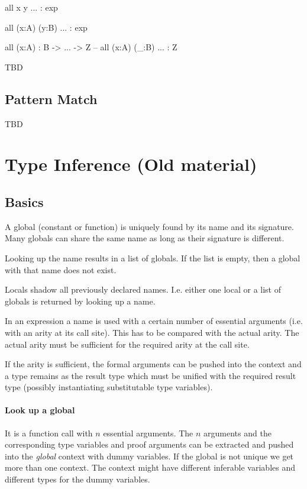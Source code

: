 \begin{alba}
  all x y ... : exp

  all (x:A) (y:B) ... : exp

  all (x:A) : B -> ... -> Z        -- all (x:A) (_:B) ... : Z
\end{alba}

\vskip 5mm
TBD
\vskip 5mm





\subsection{Pattern Match}

\vskip 5mm
TBD
\vskip 5mm







\newpage
\section{Type Inference (Old material)}

\subsection{Basics}

A global (constant or function) is uniquely found by its name and its
signature. Many globals can share the same name as long as their signature is
different.

Looking up the name results in a list of globals. If the list is empty, then a
global with that name does not exist.

Locals shadow all previously declared names. I.e. either one local or a list
of globals is returned by looking up a name.

In an expression a name is used with a certain number of essential arguments
(i.e. with an arity at its call site). This has to be compared with the actual
arity. The actual arity must be sufficient for the required arity at the call
site.

If the arity is sufficient, the formal arguments can be pushed into the
context and a type remains as the result type which must be unified with the
required result type (possibly instantiating substitutable type variables).


\paragraph{Look up a global} It is a function call with $n$ essential
arguments. The $n$ arguments and the corresponding type variables and proof
arguments can be extracted and pushed into the \emph{global} context with
dummy variables. If the global is not unique we get more than one context. The
context might have different inferable variables and different types for the
dummy variables.

